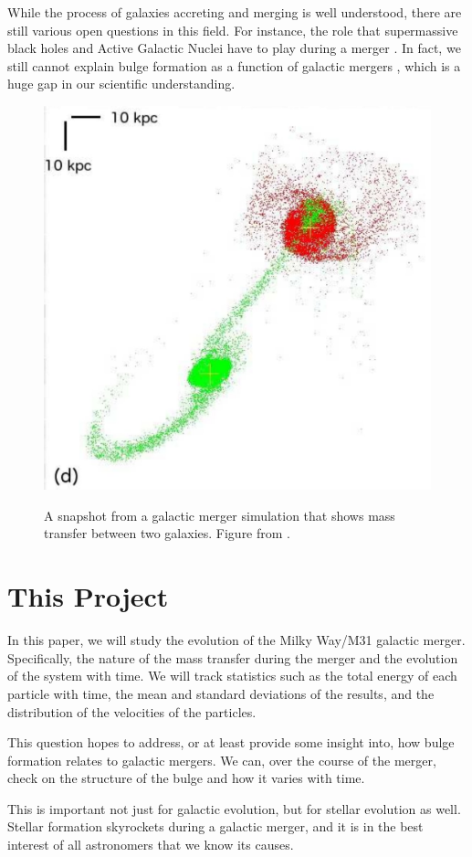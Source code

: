 \documentclass[linenumbers]{aastex631} %
\begin{document}
While the process of galaxies accreting and merging is well understood, there are still various open questions in this field. For instance, the role that supermassive black holes and Active Galactic Nuclei have to play during a merger \citep{Silverman_2011}. In fact, we still cannot explain bulge formation as a function of galactic mergers \citep{Brooks2016}, which is a huge gap in our scientific understanding.

\begin{figure}
    \centering
    \includegraphics[width = 0.5\linewidth]{page08_1.jpg}
    \label{fig:Privon image}
    \caption{A snapshot from a galactic merger simulation that shows mass transfer between two galaxies. Figure from \citep{Privon_2013}.}
\end{figure}


\section{This Project}

In this paper, we will study the evolution of the Milky Way/M31 galactic merger. Specifically, the nature of the mass transfer during the merger and the evolution of the system with time. We will track statistics such as the total energy of each particle with time, the mean and standard deviations of the results, and the distribution of the velocities of the particles.

This question hopes to address, or at least provide some insight into, how bulge formation relates to galactic mergers. We can, over the course of the merger, check on the structure of the bulge and how it varies with time. 

This is important not just for galactic evolution, but for stellar evolution as well. Stellar formation skyrockets during a galactic merger, and it is in the best interest of all astronomers that we know its causes.
\end{document}
